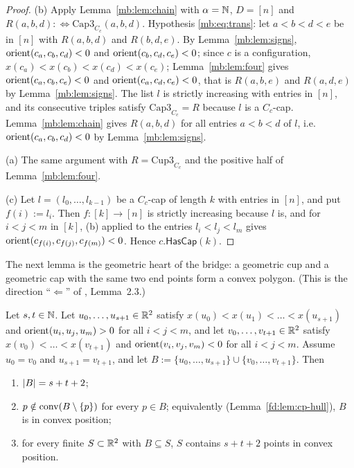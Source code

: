 \begin{proof}
(b) Apply Lemma~\ref{mb:lem:chain} with $\alpha=\mathbb N$, $D=[n]$ and $R(a,b,d):\Leftrightarrow\mathrm{Cap3}_{C_c}(a,b,d)$.
Hypothesis \eqref{mb:eq:trans}: let $a<b<d<e$ be in $[n]$ with $R(a,b,d)$ and $R(b,d,e)$. By Lemma~\ref{mb:lem:signs},
$\operatorname{orient}(c_a,c_b,c_d)<0$ and $\operatorname{orient}(c_b,c_d,c_e)<0$; since $c$ is a configuration,
$x(c_a)<x(c_b)<x(c_d)<x(c_e)$; Lemma~\ref{mb:lem:four} gives $\operatorname{orient}(c_a,c_b,c_e)<0$ and $\operatorname{orient}(c_a,c_d,c_e)<0$, that
is $R(a,b,e)$ and $R(a,d,e)$ by Lemma~\ref{mb:lem:signs}. The list $l$ is strictly increasing with entries in $[n]$, and
its consecutive triples satisfy $\mathrm{Cap3}_{C_c}=R$ because $l$ is a $C_c$-cap. Lemma~\ref{mb:lem:chain} gives
$R(a,b,d)$ for all entries $a<b<d$ of $l$, i.e.\ $\operatorname{orient}(c_a,c_b,c_d)<0$ by Lemma~\ref{mb:lem:signs}.

(a) The same argument with $R=\mathrm{Cup3}_{C_c}$ and the positive half of Lemma~\ref{mb:lem:four}.

(c) Let $l=(l_0,\dots,l_{k-1})$ be a $C_c$-cap of length $k$ with entries in $[n]$, and put $f(i):=l_i$. Then
$f\colon[k]\to[n]$ is strictly increasing because $l$ is, and for $i<j<m$ in $[k]$, (b) applied to the entries
$l_i<l_j<l_m$ gives $\operatorname{orient}(c_{f(i)},c_{f(j)},c_{f(m)})<0$. Hence $c.\mathsf{HasCap}(k)$.
\end{proof}

The next lemma is the geometric heart of the bridge: a geometric cup and a geometric cap with the same two end points
form a convex polygon. (This is the direction ``$\Leftarrow$'' of , Lemma~2.3.)

\begin{lemma}\label{mb:lem:boundary}\raggedright
Let $s,t\in\mathbb N$. Let $u_0,\dots,u_{s+1}\in\mathbb R^2$ satisfy $x(u_0)<x(u_1)<\dots<x(u_{s+1})$ and $\operatorname{orient}(u_i,u_j,u_m)>0$ for
all $i<j<m$, and let $v_0,\dots,v_{t+1}\in\mathbb R^2$ satisfy $x(v_0)<\dots<x(v_{t+1})$ and $\operatorname{orient}(v_i,v_j,v_m)<0$ for all
$i<j<m$. Assume $u_0=v_0$ and $u_{s+1}=v_{t+1}$, and let $B:=\{u_0,\dots,u_{s+1}\}\cup\{v_0,\dots,v_{t+1}\}$. Then
\begin{enumerate}[label=(\alph*)]
\item $\lvert B\rvert=s+t+2$;
\item $p\notin\operatorname{conv}(B\setminus\{p\})$ for every $p\in B$; equivalently (Lemma~\ref{fd:lem:cp-hull}), $B$ is in convex
  position;
\item for every finite $S\subset\mathbb R^2$ with $B\subseteq S$, $S$ contains $s+t+2$ points in convex position.
\end{enumerate}
\end{lemma}

